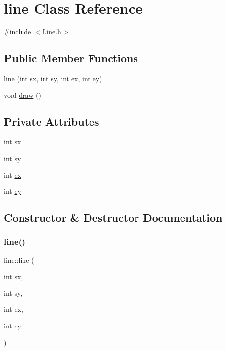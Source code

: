 \hypertarget{classline}{}\section{line Class Reference}
\label{classline}


{\ttfamily \#include $<$Line.\+h$>$}

\subsection*{Public Member Functions}
\begin{DoxyCompactItemize}
\item 
\hyperlink{classline_a228fedb37c2f7266e833dd2c00ad9fc1}{line} (int \hyperlink{classline_a75af55c0f7d0f1f113d12fd6e1d53ed0}{sx}, int \hyperlink{classline_afd9ace37f8fe42bf6438208f6acfae74}{sy}, int \hyperlink{classline_ab3aa6549e46960b1d65b6286b1e4a5c5}{ex}, int \hyperlink{classline_a9967b1a26c3c8abf1906e5f5e12be9d3}{ey})
\item 
void \hyperlink{classline_ac3edc76a59ee53e240875513073c447c}{draw} ()
\end{DoxyCompactItemize}
\subsection*{Private Attributes}
\begin{DoxyCompactItemize}
\item 
int \hyperlink{classline_a75af55c0f7d0f1f113d12fd6e1d53ed0}{sx}
\item 
int \hyperlink{classline_afd9ace37f8fe42bf6438208f6acfae74}{sy}
\item 
int \hyperlink{classline_ab3aa6549e46960b1d65b6286b1e4a5c5}{ex}
\item 
int \hyperlink{classline_a9967b1a26c3c8abf1906e5f5e12be9d3}{ey}
\end{DoxyCompactItemize}


\subsection{Constructor \& Destructor Documentation}
\mbox{\label{classline_a228fedb37c2f7266e833dd2c00ad9fc1}} 
\subsubsection{\texorpdfstring{line()}{line()}}
{\footnotesize\ttfamily line\+::line (\begin{DoxyParamCaption}\item[{int}]{sx,  }\item[{int}]{sy,  }\item[{int}]{ex,  }\item[{int}]{ey }\end{DoxyParamCaption})}



